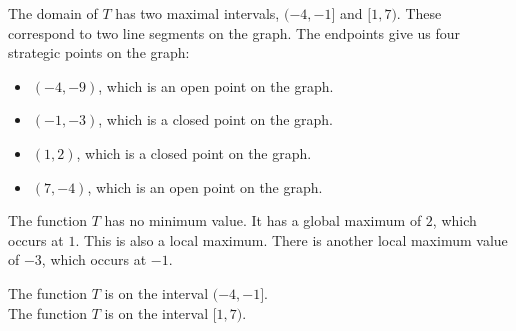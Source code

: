 \documentclass{ximera}
\begin{document}
\begin{example}
\begin{image}
\end{image}







The domain of $T$ has two maximal intervals, $(-4,-1]$ and $[1,7)$.  These correspond to two line segments on the graph. The endpoints give us four strategic points on the graph: 

\begin{itemize}

\item $(-4, -9)$, which is an open point on the graph.
\item $(-1, -3)$, which is a closed point on the graph.
\item $(1, 2)$, which is a closed point on the graph.
\item $(7, -4)$, which is an open point on the graph.

\end{itemize}


The function $T$ has no minimum value.  It has a global maximum of $2$, which occurs at $1$.  This is also a local maximum.  There is another local maximum value of $-3$, which occurs at $-1$.

\begin{question}
The function $T$ is  on the interval $(-4,-1]$. \\
The function $T$ is  on the interval $[1, 7)$.
\end{question}



\end{example}
\end{document}
